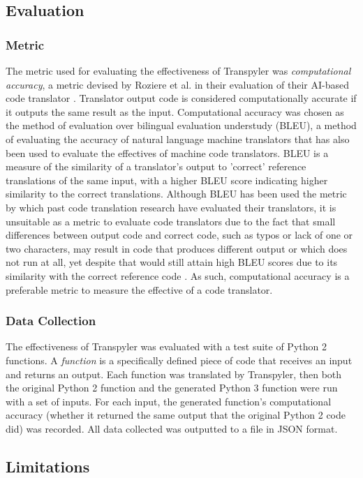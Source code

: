 \subsection{Evaluation}
\subsubsection{Metric}
The metric used for evaluating the effectiveness of Transpyler was \textit{computational accuracy}, a metric devised by Roziere et al. in their evaluation of their AI-based code translator \autocite{Roziere}. Translator output code is considered computationally accurate if it outputs the same result as the input. Computational accuracy was chosen as the method of evaluation over bilingual evaluation understudy (BLEU), a method of evaluating the accuracy of natural language machine translators that has also been used to evaluate the effectives of machine code translators. BLEU is a measure of the similarity of a translator's output to 'correct' reference translations of the same input, with a higher BLEU score indicating higher similarity to the correct translations. Although BLEU has been used the metric by which past code translation research have evaluated their translators, it is unsuitable as a metric to evaluate code translators due to the fact that small differences between output code and correct code, such as typos or lack of one or two characters, may result in code that produces different output or which does not run at all, yet despite that would still attain high BLEU scores due to its similarity with the correct reference code \autocite{Roziere}. As such, computational accuracy is a preferable metric to measure the effective of a code translator.
\subsubsection{Data Collection}
The effectiveness of Transpyler was evaluated with a test suite of Python 2 functions. A \textit{function} is a specifically defined piece of code that receives an input and returns an output. Each function was translated by Transpyler, then both the original Python 2 function and the generated Python 3 function were run with a set of inputs. For each input, the generated function's computational accuracy (whether it returned the same output that the original Python 2 code did) was recorded. All data collected was outputted to a file in JSON format.

\subsection{Limitations}
